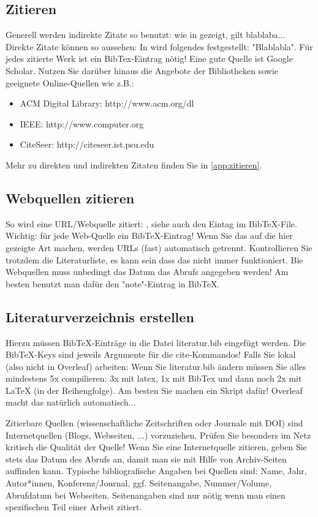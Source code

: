 \subsection{Zitieren}\label{sec:zitate}
Generell werden indirekte Zitate so benutzt: wie in \cite{clemen1989combining} gezeigt, gilt blablaba...
Direkte Zitate können so aussehen: In \cite{gilabert2006intelligent} wird folgendes festgestellt: "Blablabla". 
Für jedes zitierte Werk ist ein BibTex-Eintrag nötig! Eine gute Quelle ist Google Scholar. Nutzen Sie darüber hinaus die Angebote der Bibliotheken sowie geeignete Online-Quellen wie z.B.:
\begin{itemize}
\item ACM Digital Library: http://www.acm.org/dl
\item IEEE: http://www.computer.org
\item  CiteSeer: http://citeseer.ist.psu.edu
\end{itemize}
Mehr zu direkten und indirekten Zitaten finden Sie in \ref{app:zitieren}.

\subsection{Webquellen zitieren}\label{sec:webquellen}
So wird eine URL/Webquelle zitiert: \cite{shiny1}, siehe auch den Eintag im BibTeX-File.
Wichtig: für jede Web-Quelle ein BibTeX-Eintrag! Wenn Sie das auf die hier gezeigte Art machen, werden URLs (fast) automatisch getrennt. Kontrollieren Sie trotzdem die Literaturliste, es kann sein dass das nicht immer funktioniert. Bie Webquellen muss unbedingt das Datum das Abrufs angegeben werden! Am besten benutzt man dafür den "note"-Eintrag in BibTeX.

\subsection{Literaturverzeichnis erstellen}
Hierzu müssen BibTeX-Einträge in die Datei literatur.bib eingefügt werden. Die BibTeX-Keys sind jeweils Argumente für die cite-Kommandos! Falls Sie lokal (also nicht in Overleaf) arbeiten: Wenn Sie literatur.bib ändern müssen Sie alles mindestens 5x compilieren: 3x mit latex, 1x mit BibTex und dann noch 2x mit LaTeX (in der Reihengfolge). Am besten Sie machen ein Skript dafür! Overleaf macht das natürlich automatisch...

Zitierbare Quellen (wissenschaftliche Zeitschriften oder Journale mit DOI) sind Internetquellen (Blogs, Webseiten, ...) vorzuziehen. Prüfen Sie besonders im Netz kritisch die Qualität der Quelle! Wenn Sie eine Internetquelle zitieren, geben Sie stets das Datum des Abrufs an, damit man sie mit Hilfe von Archiv-Seiten auffinden kann. Typische bibliografische Angaben bei Quellen sind: 
Name, Jahr, Autor*innen, Konferenz/Journal, ggf. Seitenangabe, Nummer/Volume, Abrufdatum bei Webseiten. Seitenangaben sind nur nötig wenn man einen spezifischen Teil einer Arbeit zitiert.

